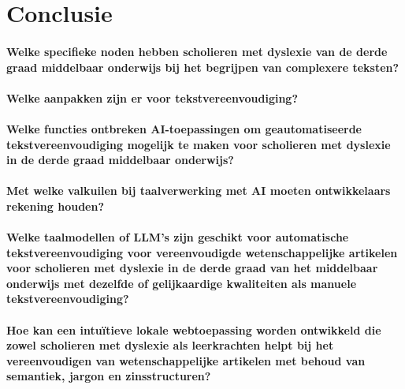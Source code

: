 
\chapter{Conclusie}%
\label{ch:conclusie}

\subsubsection{Welke specifieke noden hebben scholieren met dyslexie van de derde graad middelbaar onderwijs bij het begrijpen van complexere teksten?}


\subsubsection{Welke aanpakken zijn er voor tekstvereenvoudiging?}



\subsubsection{Welke functies ontbreken AI-toepassingen om geautomatiseerde tekstvereenvoudiging mogelijk te maken voor scholieren met dyslexie in de derde graad middelbaar onderwijs?}

 
\subsubsection{Met welke valkuilen bij taalverwerking met AI moeten ontwikkelaars rekening houden?}


\subsubsection{Welke taalmodellen of LLM's zijn geschikt voor automatische tekstvereenvoudiging voor vereenvoudigde wetenschappelijke artikelen voor scholieren met dyslexie in de derde graad van het middelbaar onderwijs met dezelfde of gelijkaardige kwaliteiten als manuele tekstvereenvoudiging?}


\subsubsection{Hoe kan een intuïtieve lokale webtoepassing worden ontwikkeld die zowel scholieren met dyslexie als leerkrachten helpt bij het vereenvoudigen van wetenschappelijke artikelen met behoud van semantiek, jargon en zinsstructuren?}
